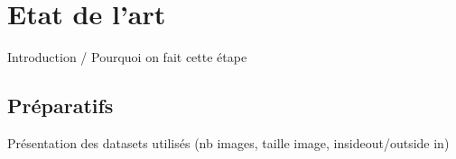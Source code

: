 \chapter{Etat de l'art}
\par


Introduction / Pourquoi on fait cette étape

\section{Préparatifs}

Présentation des datasets utilisés (nb images, taille image, insideout/outside in)


